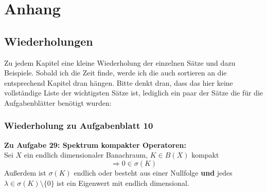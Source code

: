 
\chapter*{Anhang}  


\section*{Wiederholungen}  



Zu jedem Kapitel eine kleine Wiederholung der einzelnen Sätze und dazu Beispiele. Sobald ich die Zeit finde, werde ich die auch sortieren an die entsprechend Kapitel dran hängen. Bitte denkt dran, dass das hier keine vollständige Liste der wichtigsten Sätze ist, lediglich ein paar der Sätze die für die Aufgabenblätter benötigt wurden:	 %

\subsection*{Wiederholung zu Aufgabenblatt 10}

\textbf{Zu Aufgabe 29: Spektrum kompakter Operatoren:} \\
Sei $X$ ein endlich dimensionaler Banachraum, $K \in B(X)$ kompakt
	\[ \Rightarrow 0 \in \sigma(K) \]
Außerdem ist $\sigma(K)$ endlich oder besteht aus einer Nullfolge \textbf{und} jedes $\lambda \in \sigma(K) \setminus \{ 0 \}$ ist ein Eigenwert mit endlich dimensional. 
~ \newline

